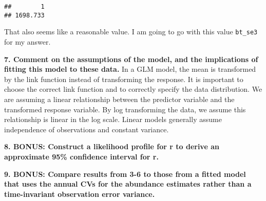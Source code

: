 \documentclass[
]{article}
\begin{document}
\begin{verbatim}
##        1 
## 1698.733
\end{verbatim}

That also seems like a reasonable value. I am going to go with this
value \texttt{bt\_se3} for my answer.

\textbf{7. Comment on the assumptions of the model, and the implications
of fitting this model to these data.} In a GLM model, the mean is
transformed by the link function instead of transforming the response.
It is important to choose the correct link function and to correctly
specify the data distribution. We are assuming a linear relationship
between the predictor variable and the transformed response variable. By
log transforming the data, we assume this relationship is linear in the
log scale. Linear models generally assume independence of observations
and constant variance.

\textbf{8. BONUS: Construct a likelihood profile for r to derive an
approximate 95\% confidence interval for r.}

\textbf{9. BONUS: Compare results from 3-6 to those from a fitted model
that uses the annual CVs for the abundance estimates rather than a
time-invariant observation error variance.}
\end{document}
